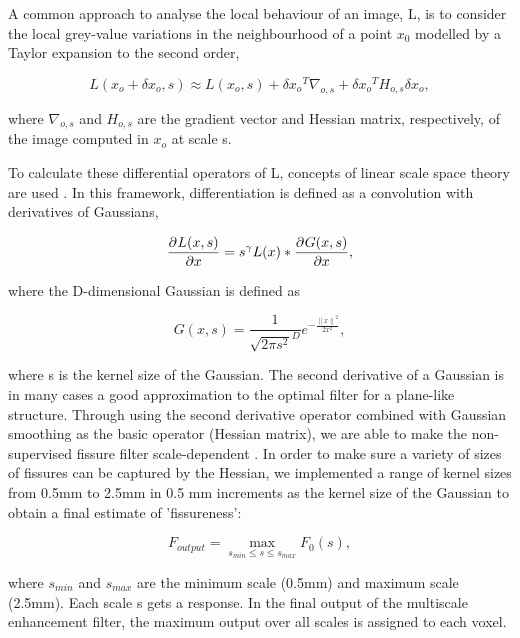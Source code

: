 {A common approach to analyse the local behaviour of an image, L, is to consider the local grey-value variations in the neighbourhood of a point $x_0$ modelled by a Taylor expansion to the second order,

\begin{equation}
 \label{eq:FissureDetection1}
 L(x_o + \delta x_o, s) \approx L(x_o, s) + \delta{x_o}^T\nabla_{o,s} + \delta{x_o}^TH_{o,s}\delta x_o,
\end{equation}

\noindent where $\nabla_{o,s}$ and $H_{o,s}$ are the gradient vector and Hessian matrix, respectively, of the image computed in $x_o$ at scale s.

To calculate these differential operators of L, concepts of linear scale space theory are used \citep{koenderink1984structure,florack1992scale}. In this framework, differentiation is defined as a convolution with derivatives of Gaussians,

\begin{equation}
 \label{eq:FissureDetection2}
 \frac{\partial^{} L(x,s)}{\partial x} = s^\gamma L(x)*\frac{\partial^{} G(x,s)}{\partial x},
\end{equation}

\noindent where the D-dimensional Gaussian is defined as

\begin{equation}
 \label{eq:FissureDetection3}
 G(x,s) = \frac{1}{{\sqrt{2\pi s^2}}^D}e^{-\frac{{\lVert x \rVert}^2}{2x^2}},
\end{equation}

\noindent where s is the kernel size of the Gaussian. The second derivative of a Gaussian is in many cases a good approximation to the optimal filter for a plane-like structure. Through using the second derivative operator combined with Gaussian smoothing as the basic operator (Hessian matrix), we are able to make the non-supervised fissure filter scale-dependent \citep{lorenz1997multi, li2003selective}. In order to make sure a variety of sizes of fissures can be captured by the Hessian, we implemented a range of kernel sizes from 0.5mm to 2.5mm in 0.5 mm increments as the kernel size of the Gaussian to obtain a final estimate of 'fissureness':

\begin{equation}
\label{eq:Multiscale}
F_{output} = \operatorname*{max}\limits_{s_{min}\leq s \leq s_{max}} F_0 (s),
\end{equation}

\noindent where $s_{min}$ and $s_{max}$ are the minimum scale (0.5mm) and maximum scale (2.5mm). Each scale s gets a response. In the final output of the multiscale enhancement filter, the maximum output over all scales is assigned to each voxel.

}
